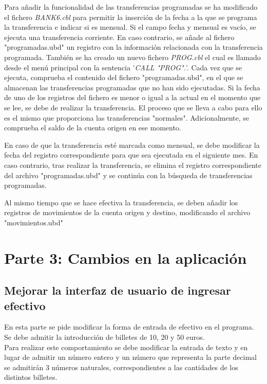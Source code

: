 \documentclass[10pt,a4paper]{article}
\begin{document}
Para añadir la funcionalidad de las transferencias programadas se ha modificado el fichero \textit{BANK6.cbl} para permitir la inserción de la fecha a la que se programa la transferencia e indicar si es mensual. Si el campo fecha y mensual es vacío, se ejecuta una transferencia corriente. En caso contrario, se añade al fichero "programadas.ubd" un registro con la información relacionada con la transferencia programada. También se ha creado un nuevo fichero \emph{PROG.cbl} el cual es llamado desde el menú principal con la sentencia '\emph{CALL "PROG".}'. Cada vez que se ejecuta, comprueba el contenido del fichero "programadas.ubd", en el que se almacenan las transferencias programadas que no han sido ejecutadas. Si la fecha de uno de los registros del fichero es menor o igual a la actual en el momento que se lee, se debe de realizar la transferencia. El proceso que se lleva a cabo para ello es el mismo que proporciona las transferencias "normales". Adicionalmente, se comprueba el saldo de la cuenta origen en ese momento. \par
En caso de que la transferencia esté marcada como mensual, se debe modificar la fecha del registro correspondiente para que sea ejecutada en el siguiente mes. En caso contrario, tras realizar la transferencia, se elimina el registro correspondiente del archivo "programadas.ubd" y se continúa con la búsqueda de transferencias programadas. \par
Al mismo tiempo que se hace efectiva la transferencia, se deben añadir los registros de movimientos de la cuenta origen y destino, modificando el archivo "movimientos.ubd"

\section{Parte 3: Cambios en la aplicación}

\subsection{Mejorar la interfaz de usuario de ingresar efectivo}

En esta parte se pide modificar la forma de entrada de efectivo en el programa. Se debe admitir la introducción de billetes de 10, 20 y 50 euros.\\
Para realizar este comportamiento se debe modificar la entrada de texto y en lugar de admitir un número entero y un número que representa la parte decimal se admitirán 3 números naturales, correspondientes a las cantidades de los distintos billetes.\\
\end{document}
